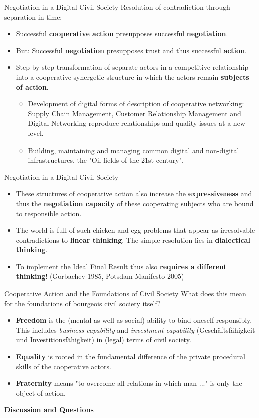 \documentclass{beamer}
\begin{document}
\begin{frame}{Negotiation in a Digital Civil Society}
Resolution of contradiction through separation in time:
\begin{itemize}
\item Successful \textbf{cooperative action} presupposes successful
  \textbf{negotiation}.
\item But: Successful \textbf{negotiation} presupposes trust and thus
  successful \textbf{action}.
\item Step-by-step transformation of separate actors in a competitive
  relationship into a cooperative synergetic structure in which the actors
  remain \textbf{subjects of action}.
  \begin{itemize}
  \item Development of digital forms of description of cooperative networking:
    Supply Chain Management, Customer Relationship Management and Digital
    Networking reproduce relationships and quality issues at a new level.
  \item Building, maintaining and managing common digital and non-digital
    infrastructures, the "Oil fields of the 21st century".
  \end{itemize}
\end{itemize}
\end{frame}

\begin{frame}{Negotiation in a Digital Civil Society}
\begin{itemize}
\item These structures of cooperative action also increase the
  \textbf{expressiveness} and thus the \textbf{negotiation capacity} of these
  cooperating subjects who are bound to responsible action.
\item The world is full of such chicken-and-egg problems that appear as
  irresolvable contradictions to \textbf{linear thinking}. The simple
  resolution lies in \textbf{dialectical thinking}.
\item To implement the Ideal Final Result thus also \textbf{requires a
  different thinking}! (Gorbachev 1985, Potsdam Manifesto 2005)
\end{itemize}
\end{frame}

\begin{frame}{Cooperative Action and the Foundations of Civil Society}
  What does this mean for the foundations of bourgeois civil society itself?
  \begin{itemize}
  \item \textbf{Freedom} is the (mental as well as social) ability to bind
    oneself responsibly. This includes \emph{business capability} and
    \emph{investment capability} (Geschäftsfähigkeit und
    Investitionsfähigkeit) in (legal) terms of civil society.
  \item \textbf{Equality} is rooted in the fundamental difference of the
    private procedural skills of the cooperative actors.
  \item \textbf{Fraternity} means "to overcome all relations in which man
    ..." is only the object of action.
  \end{itemize}
\end{frame}

\begin{frame}{}\centering\LARGE\bf
  Discussion and Questions
\end{frame}
\end{document}
